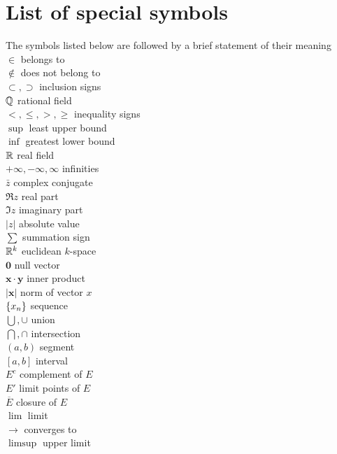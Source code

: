 \chapter*{List of special symbols}

\twocolumn
The symbols listed below are followed by a brief statement of their meaning \\
$\in $ belongs to \\
$\not\in $ does not belong to \\
$\subset , \supset $ inclusion signs \\
${\protect\mathbb Q} $ rational field \\
$<, \leq, >, \geq$ inequality signs \\
$\sup $ least upper bound \\
$\inf $ greatest lower bound \\
${\protect\mathbb R} $ real field \\
$+\infty, -\infty, \infty $ infinities \\
$\bar{z}$ complex conjugate \\
$\Re {z}$ real part \\
$\Im {z}$ imaginary part \\
$\left| z \right| $ absolute value \\
$\sum$ summation sign \\
${\protect\mathbb R}^k$ euclidean $k$-space \\
$\mathbf{0}$ null vector \\
$\mathbf{x\cdot y}$ inner product \\
$\left| \mathbf{x} \right| $ norm of vector $x$ \\
$\protect\{x_n\}$ sequence \\
$\bigcup, \cup$ union \\
$\bigcap, \cap$ intersection \\
$(a,b)$ segment \\
$[a,b]$ interval \\
$E^c$ complement of $E$ \\
$E'$ limit points of $E$ \\
$\overline{E}$ closure of $E$ \\
$\lim $ limit \\
$\rightarrow$ converges to \\
$\limsup $ upper limit \\
